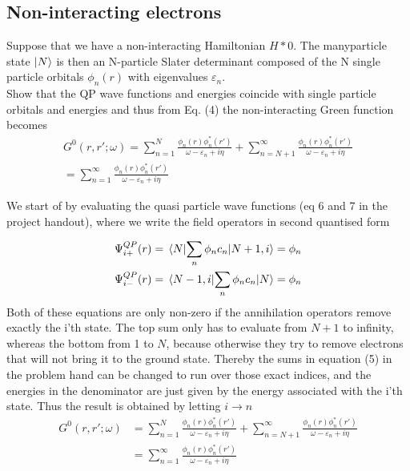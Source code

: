 \subsection{Non-interacting electrons}
\begin{exercise}
Suppose that we have a non-interacting Hamiltonian $H*0$. The manyparticle state $|N\rangle$ is then an N-particle Slater determinant composed of the N single particle orbitals $\phi_n(r)$ with eigenvalues $\varepsilon_n$. \\
Show that the QP wave functions and energies coincide with single particle orbitals and energies and thus from Eq. (4) the non-interacting Green function becomes
\begin{equation}\label{eq:nonintGreens}
    \begin{split}
        G^0(r,r';\omega) = \sum_{n=1}^N \frac{\phi_n(r) \phi_n^*(r')}{\omega- \varepsilon_n + i \eta} + \sum_{n=N+1}^{\infty} \frac{\phi_n(r) \phi_n^*(r')}{\omega- \varepsilon_n + i \eta}  \\
        = \sum_{n=1}^{\infty} \frac{\phi_n(r) \phi_n^*(r')}{\omega- \varepsilon_n + i \eta}
    \end{split}
\end{equation}
\end{exercise}

\begin{solution}
We start of by evaluating the quasi particle wave functions (eq 6 and 7 in the project handout), where we write the field operators in second quantised form

\begin{equation}
    \begin{split}
        \Psi_{i+}^{QP}(r) = \mel{N}{\sum_n \phi_n c_n}{N+1,i} = \phi_n \\
        \Psi_{i-}^{QP}(r) = \mel{N-1,i}{\sum_n \phi_n c_n}{N} = \phi_n
    \end{split}
\end{equation}
Both of these equations are only non-zero if the annihilation operators remove exactly the i'th state. The top sum only has to evaluate from $N+1$ to infinity, whereas the bottom from 1 to $N$, because otherwise they try to remove electrons that will not bring it to the ground state. Thereby the sums in equation (5) in the problem hand can be changed to run over those exact indices, and the energies in the denominator are just given by the energy associated with the i'th state. Thus the result is obtained by letting $i \rightarrow n$
\begin{equation}
    \begin{split}
        G^0(r,r';\omega) &= \sum_{n=1}^N \frac{\phi_n(r) \phi_n^*(r')}{\omega- \varepsilon_n + i \eta} + \sum_{n=N+1}^{\infty} \frac{\phi_n(r) \phi_n^*(r')}{\omega- \varepsilon_n + i \eta}  \\
        &= \sum_{n=1}^{\infty} \frac{\phi_n(r) \phi_n^*(r')}{\omega- \varepsilon_n + i \eta}
    \end{split}
\end{equation}
\end{solution}

